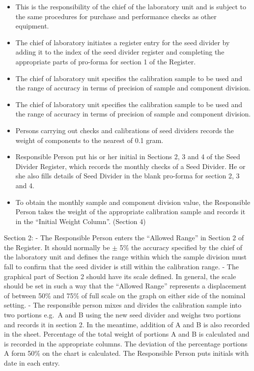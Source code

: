 \documentclass[]{book}
\providecommand{\tightlist}{%
  \setlength{\itemsep}{0pt}\setlength{\parskip}{0pt}}
\begin{document}
\begin{itemize}
\tightlist
\item
  This is the responsibility of the chief of the laboratory unit and is
  subject to the same procedures for purchase and performance checks as
  other equipment.
\item
  The chief of laboratory initiates a register entry for the seed
  divider by adding it to the index of the seed divider register and
  completing the appropriate parts of pro-forma for section 1 of the
  Register.
\item
  The chief of laboratory unit specifies the calibration sample to be
  used and the range of accuracy in terms of precision of sample and
  component division.
\item
  The chief of laboratory unit specifies the calibration sample to be
  used and the range of accuracy in terms of precision of sample and
  component division.
\item
  Persons carrying out checks and calibrations of seed dividers records
  the weight of components to the nearest of 0.1 gram.
\item
  Responsible Person put his or her initial in Sections 2, 3 and 4 of
  the Seed Divider Register, which records the monthly checks of a Seed
  Divider. He or she also fills details of Seed Divider in the blank
  pro-forma for section 2, 3 and 4.
\item
  To obtain the monthly sample and component division value, the
  Responsible Person takes the weight of the appropriate calibration
  sample and records it in the ``Initial Weight Column''. (Section 4)
\end{itemize}

Section 2: - The Responsible Person enters the ``Allowed Range'' in
Section 2 of the Register. It should normally be \(\pm\) 5\% the
accuracy specified by the chief of the laboratory unit and defines the
range within which the sample division must fall to confirm that the
seed divider is still within the calibration range. - The graphical part
of Section 2 should have its scale defined. In general, the scale should
be set in such a way that the ``Allowed Range'' represents a
displacement of between 50\% and 75\% of full scale on the graph on
either side of the nominal setting. - The responsible person mixes and
divides the calibration sample into two portions e.g.~A and B using the
new seed divider and weighs two portions and records it in section 2. In
the meantime, addition of A and B is also recorded in the sheet.
Percentage of the total weight of portions A and B is calculated and is
recorded in the appropriate columns. The deviation of the percentage
portions A form 50\% on the chart is calculated. The Responsible Person
puts initials with date in each entry.
\end{document}

